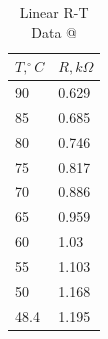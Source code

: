 \documentclass[a4,11pt]{article}
\makeatletter
\newcommand*{\rom}[1]{\expandafter\@slowromancap\romannumeral #1@}
\makeatother
\begin{document}
\begin{table}[H]
	\centering
	\caption{Linear R-T Data \rom{2}}
	\begin{tabular}{l|l}
		\hline
		$T, ^{\circ}C$ & $R, k\Omega$ \\
		\hline
		90 & 0.629  \\
		85 & 0.685  \\
		80 & 0.746  \\
		75 & 0.817  \\
		70 & 0.886  \\
		65 & 0.959  \\
		60 & 1.03  \\
		55 & 1.103  \\
		50 & 1.168  \\
		48.4 & 1.195  \\
	\end{tabular}
\end{table}
\end{document}
